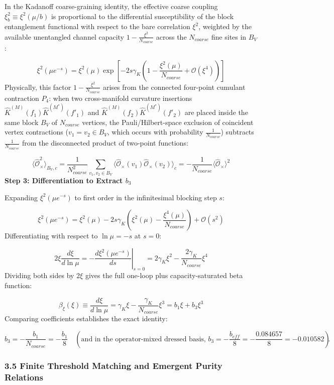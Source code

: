 \documentclass[aps,prd,onecolumn,superscriptaddress,nofootinbib,longbibliography,10pt]{revtex4-2}
\begin{document}
{{  In the Kadanoff coarse-graining identity, the effective coarse coupling \(\xi_b^2 \equiv \xi^2(\mu/b)\) is proportional to the differential susceptibility of the block entanglement functional with respect to the bare correlation \(\xi^2\), weighted by the available unentangled channel capacity \(1 - \frac{\xi^2}{N_{coarse}}\) across the \(N_{coarse}\) fine sites in \(B_V\):


  \[ \xi^2(\mu e^{-s}) = \xi^2(\mu)\exp\left[ -2s\gamma_K\left(1 - \frac{\xi^2(\mu)}{N_{coarse}} + \mathcal{O}(\xi^4)\right) \right] \]
  Physically, this factor \(1 - \frac{\xi^2}{N_{coarse}}\) arises from the connected four-point cumulant contraction \(P_4\): when two cross-manifold curvature insertions \(\hat{K}^{(M)}(f_1)\hat{K}^{(M^*)}(f'_1)\) and \(\hat{K}^{(M)}(f_2)\hat{K}^{(M^*)}(f'_2)\) are placed inside the same block \(B_V\) of \(N_{coarse}\) vertices, the Pauli/Hilbert-space exclusion of coincident vertex contractions (\(v_1 = v_2 \in B_V\), which occurs with probability \(\frac{1}{N_{coarse}}\)) subtracts \(\frac{1}{N_{coarse}}\) from the disconnected product of two-point functions:


  \[ \langle\hat{\mathcal{O}}_\times^2\rangle_{B_V,c} = \frac{1}{N_{coarse}^2}\sum_{v_1, v_2\in B_V} \langle\hat{\mathcal{O}}_\times(v_1)\hat{\mathcal{O}}_\times(v_2)\rangle_c = -\frac{1}{N_{coarse}}\langle\hat{\mathcal{O}}_\times\rangle^2 \]
  \textbf{Step 3: Differentiation to Extract \(b_3\)}


  Expanding \(\xi^2(\mu e^{-s})\) to first order in the infinitesimal blocking step \(s\):


  \[ \xi^2(\mu e^{-s}) = \xi^2(\mu) - 2s\gamma_K\left(\xi^2(\mu) - \frac{\xi^4(\mu)}{N_{coarse}}\right) + \mathcal{O}(s^2) \]
  Differentiating with respect to \(\ln\mu = -s\) at \(s = 0\):


  \[ 2\xi\frac{d\xi}{d\ln\mu} = -\left.\frac{d\xi^2(\mu e^{-s})}{ds}\right|_{s=0} = 2\gamma_K\xi^2 - \frac{2\gamma_K}{N_{coarse}}\xi^4 \]
  Dividing both sides by \(2\xi\) gives the full one-loop plus capacity-saturated beta function:


  \[ \beta_\xi(\xi) \equiv \frac{d\xi}{d\ln\mu} = \gamma_K\xi - \frac{\gamma_K}{N_{coarse}}\xi^3 = b_1\xi + b_3\xi^3 \]
  Comparing coefficients establishes the exact identity:


  \[ b_3 = -\frac{b_1}{N_{coarse}} = -\frac{b_1}{8} \quad \left(\text{and in the operator-mixed dressed basis, } b_3 = -\frac{b_{eff}}{8} = -\frac{0.084657}{8} = -0.010582\right). \]

  
\subsubsection*{3.5 Finite Threshold Matching and Emergent Purity Relations}

}}
\end{document}
